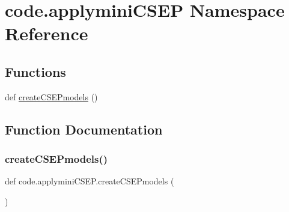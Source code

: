 \hypertarget{namespacecode_1_1applymini_c_s_e_p}{}\section{code.\+applymini\+C\+S\+EP Namespace Reference}
\label{namespacecode_1_1applymini_c_s_e_p}
\subsection*{Functions}
\begin{DoxyCompactItemize}
\item 
def \hyperlink{namespacecode_1_1applymini_c_s_e_p_ab9928930aafaa304409ecfa89b94f88e}{create\+C\+S\+E\+Pmodels} ()
\end{DoxyCompactItemize}


\subsection{Function Documentation}
\mbox{\label{namespacecode_1_1applymini_c_s_e_p_ab9928930aafaa304409ecfa89b94f88e}} 
\subsubsection{\texorpdfstring{create\+C\+S\+E\+Pmodels()}{createCSEPmodels()}}
{\footnotesize\ttfamily def code.\+applymini\+C\+S\+E\+P.\+create\+C\+S\+E\+Pmodels (\begin{DoxyParamCaption}{ }\end{DoxyParamCaption})}

